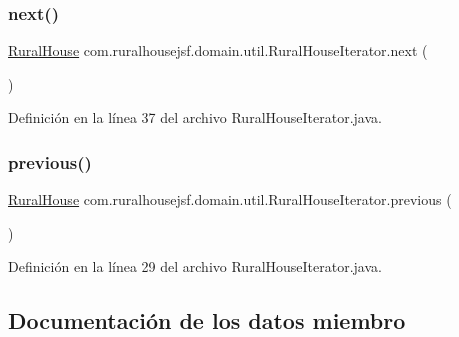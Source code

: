\subsubsection{\texorpdfstring{next()}{next()}}
{\footnotesize\ttfamily \mbox{\hyperlink{classcom_1_1ruralhousejsf_1_1domain_1_1_rural_house}{Rural\+House}} com.\+ruralhousejsf.\+domain.\+util.\+Rural\+House\+Iterator.\+next (\begin{DoxyParamCaption}{ }\end{DoxyParamCaption})}



Definición en la línea 37 del archivo Rural\+House\+Iterator.\+java.

\mbox{\label{classcom_1_1ruralhousejsf_1_1domain_1_1util_1_1_rural_house_iterator_af8df4b4ec1f3a626dbda91cf23daeb08}} 
\subsubsection{\texorpdfstring{previous()}{previous()}}
{\footnotesize\ttfamily \mbox{\hyperlink{classcom_1_1ruralhousejsf_1_1domain_1_1_rural_house}{Rural\+House}} com.\+ruralhousejsf.\+domain.\+util.\+Rural\+House\+Iterator.\+previous (\begin{DoxyParamCaption}{ }\end{DoxyParamCaption})}



Definición en la línea 29 del archivo Rural\+House\+Iterator.\+java.



\subsection{Documentación de los datos miembro}
\mbox{\label{classcom_1_1ruralhousejsf_1_1domain_1_1util_1_1_rural_house_iterator_a834745c64bea24644840222751eb901a}} 
